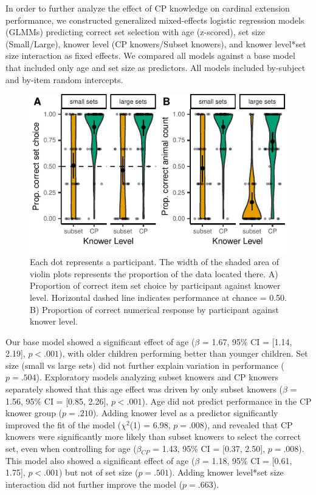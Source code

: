 \documentclass[10pt, letterpaper]{article}
\newenvironment{CodeChunk}{}{}
\begin{document}
In order to further analyze the effect of CP knowledge on cardinal
extension performance, we constructed generalized mixed-effects logistic
regression models (GLMMs) predicting correct set selection with age
(z-scored), set size (Small/Large), knower level (CP knowers/Subset
knowers), and knower level*set size interaction as fixed effects. We
compared all models against a base model that included only age and set
size as predictors. All models included by-subject and by-item random
intercepts.

\begin{CodeChunk}
\begin{figure}[tb]

{\centering \includegraphics{figs/study1-figure-1} 

}

\caption[Each dot represents a participant]{Each dot represents a participant. The width of the shaded area of violin plots represents the proportion of the data located there. A) Proportion of correct item set choice by participant against knower level. Horizontal dashed line indicates performance at chance = 0.50. B) Proportion of correct numerical response by participant against knower level.}\label{fig:study1-figure}
\end{figure}
\end{CodeChunk}

Our base model showed a significant effect of age (\(\beta\) = 1.67,
95\% CI = {[}1.14, 2.19{]}, \(p < .001\)), with older children
performing better than younger children. Set size (small vs large sets)
did not further explain variation in performance (\(p = .504\)).
Exploratory models analyzing subset knowers and CP knowers separately
showed that this age effect was driven by only subset knowers (\(\beta\)
= 1.56, 95\% CI = {[}0.85, 2.26{]}, \(p < .001\)). Age did not predict
performance in the CP knower group (\(p = .210\)). Adding knower level
as a predictor significantly improved the fit of the model
(\(\chi^2\)(1) = 6.98, \(p = .008\)), and revealed that CP knowers were
significantly more likely than subset knowers to select the correct set,
even when controlling for age (\(\beta\)\(_{CP}\) = 1.43, 95\% CI =
{[}0.37, 2.50{]}, \(p = .008\)). This model also showed a significant
effect of age (\(\beta\) = 1.18, 95\% CI = {[}0.61, 1.75{]},
\(p < .001\)) but not of set size (\(p = .501\)). Adding knower
level*set size interaction did not further improve the model
(\(p = .663\)).
\end{document}
